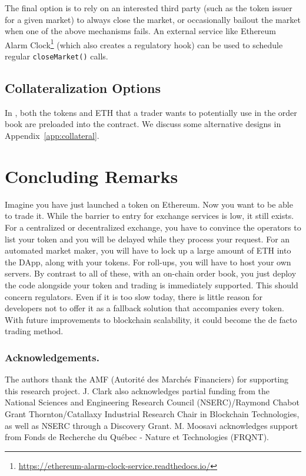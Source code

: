The final option is to rely on an interested third party (such as the token issuer for a given market) to always close the market, or  occasionally bailout the market when one of the above mechanisms fails. An external service like Ethereum Alarm Clock\footnote{\url{https://ethereum-alarm-clock-service.readthedocs.io/}}  (which also creates a regulatory hook) can be used to schedule regular \texttt{closeMarket()} calls.


\subsection{Collateralization Options}

In \cm, both the tokens and ETH that a trader wants to potentially use in the order book are preloaded into the contract. We discuss some alternative designs in Appendix~\ref{app:collateral}.


\section{Concluding Remarks}

Imagine you have just launched a token on Ethereum. Now you want to be able to trade it. While the barrier to entry for exchange services is low, it still exists. For a centralized or decentralized exchange, you have to convince the operators to list your token and you will be delayed while they process your request. For an automated market maker, you will have to lock up a large amount of ETH into the DApp, along with your tokens. For roll-ups, you will have to host your own servers. By contrast to all of these, with an on-chain order book, you just deploy the code alongside your token and trading is immediately supported. This should concern regulators. Even if it is too slow today, there is little reason for developers not to offer it as a fallback solution that accompanies every token. With future improvements to blockchain scalability, it could become the de facto trading method.

\subsubsection*{Acknowledgements.}  The authors thank the AMF (Autorité des Marchés Financiers) for supporting this research project. J. Clark also acknowledges partial funding from the National Sciences and Engineering Research Council (NSERC)/Raymond Chabot Grant Thornton/Catallaxy Industrial Research Chair in Blockchain Technologies, as well as NSERC through a Discovery Grant. M. Moosavi acknowledges support from Fonds de Recherche du Québec - Nature et Technologies (FRQNT).

